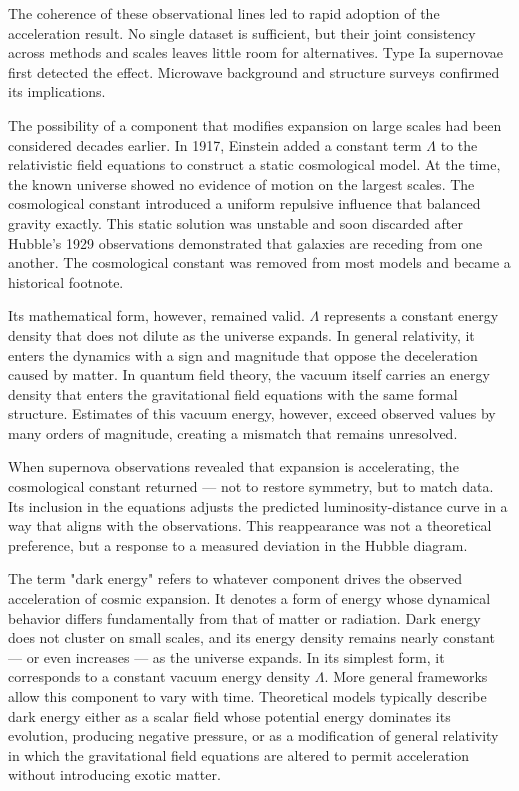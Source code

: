 The coherence of these observational lines led to rapid adoption of the acceleration result. No single dataset is sufficient, but their joint consistency across methods and scales leaves little room for alternatives. Type Ia supernovae first detected the effect. Microwave background and structure surveys confirmed its implications.

The possibility of a component that modifies expansion on large scales had been considered decades earlier. In 1917, Einstein added a constant term $\Lambda$ to the relativistic field equations to construct a static cosmological model. At the time, the known universe showed no evidence of motion on the largest scales. The cosmological constant introduced a uniform repulsive influence that balanced gravity exactly. This static solution was unstable and soon discarded after Hubble's 1929 observations demonstrated that galaxies are receding from one another. The cosmological constant was removed from most models and became a historical footnote.

Its mathematical form, however, remained valid. $\Lambda$ represents a constant energy density that does not dilute as the universe expands. In general relativity, it enters the dynamics with a sign and magnitude that oppose the deceleration caused by matter. In quantum field theory, the vacuum itself carries an energy density that enters the gravitational field equations with the same formal structure. Estimates of this vacuum energy, however, exceed observed values by many orders of magnitude, creating a mismatch that remains unresolved.

When supernova observations revealed that expansion is accelerating, the cosmological constant returned — not to restore symmetry, but to match data. Its inclusion in the equations adjusts the predicted luminosity-distance curve in a way that aligns with the observations. This reappearance was not a theoretical preference, but a response to a measured deviation in the Hubble diagram.

The term "dark energy" refers to whatever component drives the observed acceleration of cosmic expansion. It denotes a form of energy whose dynamical behavior differs fundamentally from that of matter or radiation. Dark energy does not cluster on small scales, and its energy density remains nearly constant — or even increases — as the universe expands. In its simplest form, it corresponds to a constant vacuum energy density $\Lambda$. More general frameworks allow this component to vary with time. Theoretical models typically describe dark energy either as a scalar field whose potential energy dominates its evolution, producing negative pressure, or as a modification of general relativity in which the gravitational field equations are altered to permit acceleration without introducing exotic matter.

